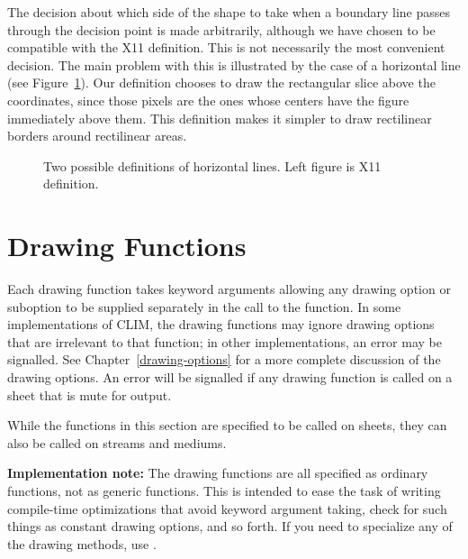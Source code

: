 The decision about which side of the shape to take when a boundary line passes
through the decision point is made arbitrarily, although we have chosen to be
compatible with the X11 definition.  This is not necessarily the most convenient
decision.  The main problem with this is illustrated by the case of a horizontal
line (see Figure~\ref{horizontal-lines}).  Our definition chooses to draw the
rectangular slice above the coordinates, since those pixels are the ones whose
centers have the figure immediately above them.  This definition makes it
simpler to draw rectilinear borders around rectilinear areas.

\begin{figure}
\ifpsfig\centerline{}\else\vspace{2.25in}\fi
\caption{\label{horizontal-lines} Two possible definitions of horizontal lines. 
Left figure is X11 definition.}
\end{figure}


\section {Drawing Functions\label{drawing-functions}}

\def\DrawingOptions{ink clipping-region transformation\ }
\def\PointOptions{line-style line-thickness line-unit}
\def\LineCapOptions{line-style line-thickness line-unit line-dashes line-cap-shape}
\def\LineJointOptions{line-style line-thickness line-unit line-dashes line-joint-shape}
\def\LineJointCapOptions{line-style line-thickness line-unit line-dashes line-joint-shape line-cap-shape}
\def\TextOptions{text-style text-family text-face text-size}

Each drawing function takes keyword arguments allowing any drawing option or
suboption to be supplied separately in the call to the function.  In some
implementations of CLIM, the drawing functions may ignore drawing options that
are irrelevant to that function; in other implementations, an error may be
signalled.  See Chapter~\ref{drawing-options} for a more complete discussion of
the drawing options.  An error will be signalled if any drawing function is
called on a sheet that is mute for output.

While the functions in this section are specified to be called on sheets, they
can also be called on streams and mediums.

{\bf Implementation note:} The drawing functions are all specified as ordinary
functions, not as generic functions.  This is intended to ease the task of
writing compile-time optimizations that avoid keyword argument taking, check for
such things as constant drawing options, and so forth.  If you need to
specialize any of the drawing methods, use .

